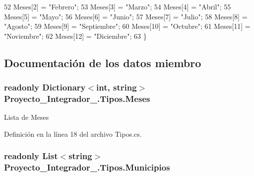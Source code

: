 \begin{DoxyCode}
52             Meses[2] = \textcolor{stringliteral}{"Febrero"};
53             Meses[3] = \textcolor{stringliteral}{"Marzo"};
54             Meses[4] = \textcolor{stringliteral}{"Abril"};
55             Meses[5] = \textcolor{stringliteral}{"Mayo"};
56             Meses[6] = \textcolor{stringliteral}{"Junio"};
57             Meses[7] = \textcolor{stringliteral}{"Julio"};
58             Meses[8] = \textcolor{stringliteral}{"Agosto"};
59             Meses[9] = \textcolor{stringliteral}{"Septiembre"};
60             Meses[10] = \textcolor{stringliteral}{"Octubre"};
61             Meses[11] = \textcolor{stringliteral}{"Noviembre"};
62             Meses[12] = \textcolor{stringliteral}{"Diciembre"};
63         \}
\end{DoxyCode}


\subsection{Documentación de los datos miembro}
\hypertarget{class_proyecto___integrador__3_1_1_tipos_a5c5105231581a49b0914b197f4aed005}{
\subsubsection[{Meses}]{\setlength{\rightskip}{0pt plus 5cm}readonly Dictionary$<$int, string$>$ Proyecto\-\_\-\-Integrador\-\_.\-Tipos.\-Meses\hspace{0.3cm}{\ttfamily [static]}}}\label{class_proyecto___integrador__3_1_1_tipos_a5c5105231581a49b0914b197f4aed005}


Lista de Meses 



Definición en la línea 18 del archivo Tipos.\-cs.

\hypertarget{class_proyecto___integrador__3_1_1_tipos_a950165b224eba3af8ee67d0b344f0704}{
\subsubsection[{Municipios}]{\setlength{\rightskip}{0pt plus 5cm}readonly List$<$string$>$ Proyecto\-\_\-\-Integrador\-\_.\-Tipos.\-Municipios\hspace{0.3cm}{\ttfamily [static]}}}\label{class_proyecto___integrador__3_1_1_tipos_a950165b224eba3af8ee67d0b344f0704}


